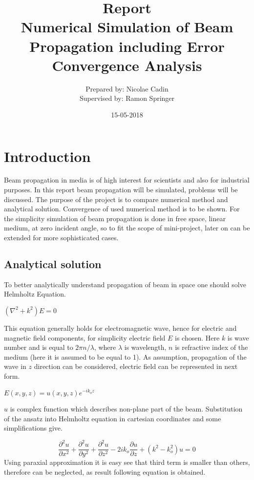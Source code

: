 \documentclass[a4paper]{article}
\title{Report\\Numerical Simulation of Beam Propagation including Error Convergence Analysis}
\date{15-05-2018}
\author{Prepared by: Nicolae Cadin \\Supervised by: Ramon Springer}
\begin{document}
		
	\maketitle
	\newpage
	\tableofcontents	

	
	\newpage
	\section{Introduction}
	Beam propagation in media is of high interest for scientists and also for industrial purposes. 
	In this report beam propagation will be simulated, problems will be discussed. The purpose of the project is to compare numerical method and analytical solution. Convergence of used numerical method is to be shown. For the simplicity simulation of beam propagation is done in free space, linear medium, at zero incident angle, so to fit the scope of mini-project, later on can be extended for more sophisticated cases.
	\subsection{Analytical solution}
	To better analytically understand propagation of beam in space one should solve Helmholtz Equation.
	\begin{center}
		$(\nabla^2+k^2)E = 0$		
	\end{center}
	This equation generally holds for electromagnetic wave, hence for electric and magnetic field components, for simplicity electric field $E$ is chosen. Here $k$ is wave number and is equal to $2\pi n/\lambda$, where $\lambda$ is wavelength, $n$ is refractive index of the medium (here it is assumed to be equal to 1). As assumption, propagation of the wave in $z$ direction can be considered, electric field can be represented in next form.
	\begin{center}
		$E(x,y,z)=u(x,y,z)e^{-ik_oz}$
	\end{center}
	$u$ is complex function which describes non-plane part of the beam. Substitution of the ansatz into Helmholtz equation in cartesian coordinates and some simplifications give.

	\[\frac{\partial^2 u}{\partial x^2}+ \frac{\partial^2 u}{\partial y^2}+ \frac{\partial^2 u}{\partial z^2} - 2ik_o\frac{\partial u}{\partial z}+(k^2-k_o^2)u=0\]
	Using paraxial approximation it is easy see that third term is smaller than others, therefore can be neglected, as result following equation is obtained.
	
\end{document}
